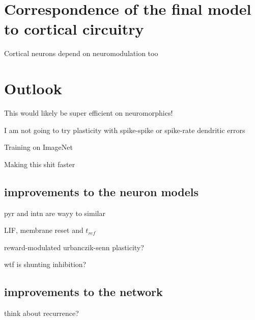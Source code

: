 \section{Correspondence of the final model to cortical circuitry}

Cortical neurons depend on neuromodulation too \cite{Roelfsema2018}



\section{Outlook}

This would likely be super efficient on neuromorphics!

I am not going to try plasticity with spike-spike or spike-rate dendritic errors

Training on ImageNet

Making this shit faster

\subsection{improvements to the neuron models}



pyr and intn are wayy to similar

LIF, membrane reset and $t_{ref}$ 

reward-modulated urbanczik-senn plasticity?

wtf is shunting inhibition?


\subsection{improvements to the network}

think about recurrence?

